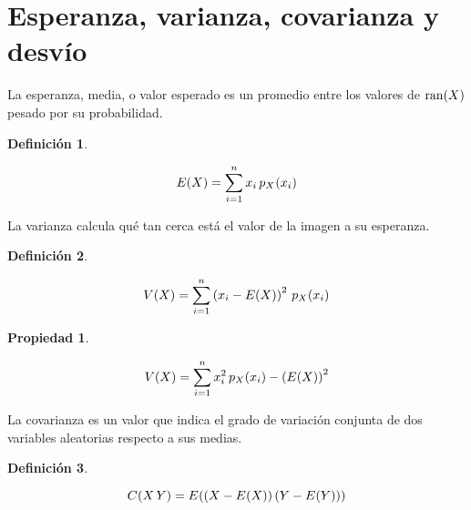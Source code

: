 \documentclass[a5paper,12pt,twoside]{book}
\newtheorem{defn}{{Definición}}[chapter]
\newtheorem{prop}{{Propiedad}}[chapter]
\begin{document}
\section{Esperanza, varianza, covarianza y desvío}

La esperanza, media, o valor esperado es un promedio entre los valores de $\ran(X)$ pesado por su probabilidad.

\begin{mdframed}[style=DefinitionFrame]
    \begin{defn}
    \end{defn}
    \begin{equation*}
        E(X) = \sum_{i=1}^n x_i \, \fx[p_X]{x_i}
    \end{equation*}
\end{mdframed}

La varianza calcula qué tan cerca está el valor de la imagen a su esperanza.

\begin{mdframed}[style=DefinitionFrame]
    \begin{defn}
    \end{defn}
    \begin{equation*}
        V(X) = \sum_{i=1}^n \inParentheses{x_i - E(X)}^2 \, p_X(x_i)
    \end{equation*}
\end{mdframed}

\begin{mdframed}[style=PropertyFrame]
    \begin{prop}
    \end{prop}
    \begin{equation*}
        V(X) = \sum_{i=1}^n x_i^2 \, p_X(x_i) - \inParentheses{E(X)}^2
    \end{equation*}
\end{mdframed}

La covarianza es un valor que indica el grado de variación conjunta de dos variables aleatorias respecto a sus medias.

\begin{mdframed}[style=DefinitionFrame]
    \begin{defn}
    \end{defn}
    \begin{equation*}
        \fx[C]{X\,Y} = \fx[E]{\inParentheses{X-\fx[E]{X}} \inParentheses{Y-\fx[E]{Y}}}
    \end{equation*}
\end{mdframed}
\end{document}
